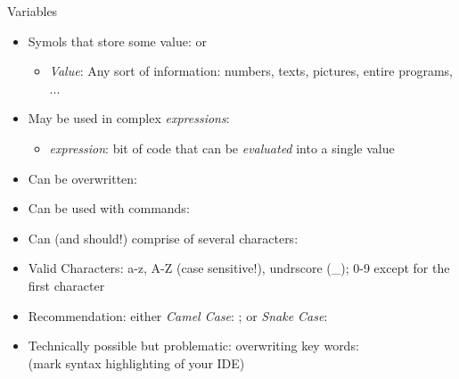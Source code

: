 \begin{frame}{Variables}
%
\begin{itemize}
\item Symols that store some value:  or 
	\begin{itemize}
	\item \emph{Value}: Any sort of information: numbers, texts, pictures, entire programs, ...
	\end{itemize}
\item May be used in complex \emph{expressions}: 
	\begin{itemize}
	\item \emph{expression}: bit of code that can be \emph{evaluated} into a single value
	\end{itemize}
\item Can be overwritten: 
\item Can be used with commands: 
\item Can (and should!) comprise of several characters: 
\item Valid Characters: a-z, A-Z (case sensitive!), undrscore (\_); 0-9 except for the first character
\item Recommendation: either \emph{Camel Case}: ; or \emph{Snake Case}: 
\item Technically possible but problematic: overwriting key words:  \\
	(mark syntax highlighting of your IDE)
\end{itemize}
%
\end{frame}


